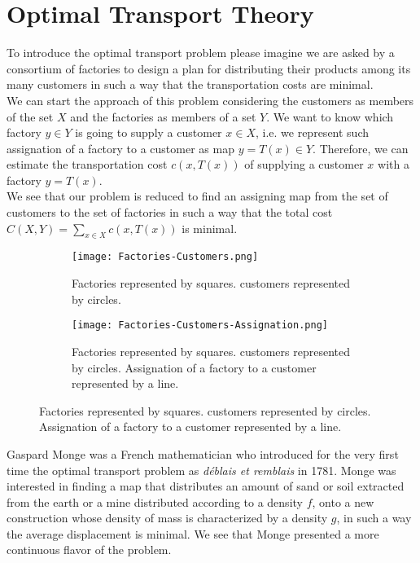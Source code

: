 \chapter{Optimal Transport Theory}

To introduce the optimal transport problem please imagine we are asked by a consortium of factories to design a plan for distributing their products among its many customers in such a way that the transportation costs are minimal. \\


We can start the approach of this problem considering the customers as members of the set $X$ and the factories as members of a set $Y$. We want to know which factory $y\in Y$ is going to supply a customer $x\in X$, i.e. we represent such assignation of a factory to a customer as map $y=T(x)\in Y$. Therefore, we can estimate the transportation cost $c(x, T(x))$ of supplying a customer $x$ with a factory $y=T(x)$.  \\

We see that our problem is reduced to find an assigning map from the set of customers to the set of factories in such a way that the total cost $C(X, Y)=\sum_{x\in X} c(x, T(x))$ is minimal.  
\\
\begin{figure}[H]
	\centering
	\caption{Illustration of the problem of Factories supplying customers.}
	\begin{subfigure}[t]{0.4\textwidth}
		\texttt{[image: Factories-Customers.png]}
		\caption{Factories represented by squares. customers represented by circles.}
	\end{subfigure}
	\hfil
	\begin{subfigure}[t]{0.4\textwidth}
		\texttt{[image: Factories-Customers-Assignation.png]}
		\caption{Factories represented by squares. customers represented by circles. Assignation of a factory to a customer represented by a line.}
	\end{subfigure}	
\end{figure}

Gaspard Monge was a French mathematician who introduced for the very first time the optimal transport problem as \textit{d\'eblais et remblais} in 1781. Monge was interested in finding a map that distributes an amount of sand or soil extracted from the earth or a mine distributed according to a density $f$, onto a new construction whose density of mass is characterized by a density $g$, in such a way the average displacement is minimal. We see that Monge presented a more continuous flavor of the problem. \\

